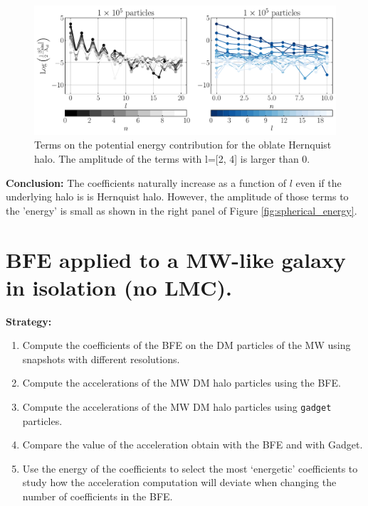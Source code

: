 \documentclass[14pt]{article}
\begin{document}
\begin{figure}[H]
  \centering
  \includegraphics[scale=0.5]{../code/energy_terms_oblate_hern_a_40_1E5.pdf}
  \caption{Terms on the potential energy contribution for the oblate Hernquist halo.
The amplitude of the terms with l=[2, 4] is larger than 0.} \label{fig:energy_oblate}
\end{figure}




\textbf{Conclusion:} The coefficients naturally increase as a function of $l$
even if the underlying halo is is Hernquist halo. However, the amplitude of those terms
to the 'energy' is small as shown in the right panel of Figure \ref{fig:spherical_energy}.\\



\section{BFE applied to a MW-like galaxy in isolation (no LMC).}

\textbf{Strategy:}\\

\begin{enumerate}
  \item Compute the coefficients of the BFE on the DM particles of the MW using
    snapshots with different resolutions.
  \item Compute the accelerations of the MW DM halo particles using the BFE.
  \item Compute the accelerations of the MW DM halo particles using
    \verb+gadget+ particles.

  \item Compare the value of the acceleration obtain with the BFE and with
    Gadget.
  \item Use the energy of the coefficients to select the most `energetic' coefficients to study how
    the acceleration computation will deviate when changing the number of
    coefficients in the BFE.
\end{enumerate}
\end{document}
